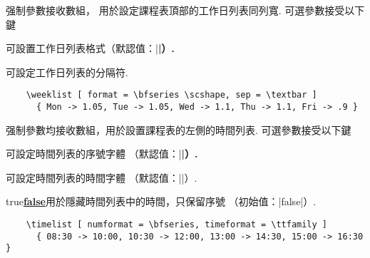 \documentclass[svgnames]{l3doc}
\def \TFF {true\textup{\textbar\underline{\textbf{false}}}}
\begin{document}
\begin{documentation}
\begin{function}{\weeklist}
  \begin{syntax}
       
  \end{syntax}
  强制參數接收數組，
  用於設定課程表頂部的工作日列表同列寬.
  可選參數接受以下鍵
  \begin{keyval}
    \item [\key{format}] 
    可設置工作日列表格式（默認值：|\bfseries|）.
    \item [\key{sep}] 
    可設定工作日列表的分隔符.
  \end{keyval}
  \begin{verbatim}
    \weeklist [ format = \bfseries \scshape, sep = \textbar ]
      { Mon -> 1.05, Tue -> 1.05, Wed -> 1.1, Thu -> 1.1, Fri -> .9 }
  \end{verbatim}
\end{function}

\begin{function}{\timelist}
  \begin{syntax}
       
  \end{syntax}
  强制參數均接收數組，用於設置課程表的左側的時間列表.
  可選參數接受以下鍵
  \begin{keyval}
    \item [\key{numformat}] 
    可設定時間列表的序號字體
    （默認值：|\ttfamily \bfseries|）.
    \item [\key{timefont}]  可設定時間列表的時間字體
    （默認值：|\ttfamily|）.
    \item [\key{hidetime}] \val\TFF 用於隱藏時間列表中的時間，只保留序號
    （初始值：|false|）.
  \end{keyval}
  \begin{verbatim}
    \timelist [ numformat = \bfseries, timeformat = \ttfamily ]
      { 08:30 -> 10:00, 10:30 -> 12:00, 13:00 -> 14:30, 15:00 -> 16:30 }
  \end{verbatim}
\end{function}


\end{documentation}
\end{document}

